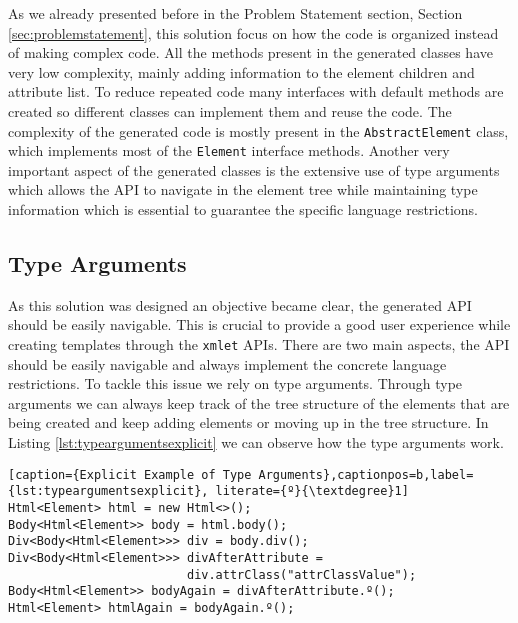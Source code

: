 As we already presented before in the Problem Statement section, Section \ref{sec:problemstatement}, this solution focus on how the code is organized instead of making complex code. All the methods present in the generated classes have very low complexity, mainly adding information to the element children and attribute list. To reduce repeated code many interfaces with default methods are created so different classes can implement them and reuse the code. The complexity of the generated code is mostly present in the \texttt{AbstractElement} class, which implements most of the \texttt{Element} interface methods. Another very important aspect of the generated classes is the extensive use of type arguments which allows the \ac{API} to navigate in the element tree while maintaining type information which is essential to guarantee the specific language restrictions.

\subsection{Type Arguments}
\label{sec:typearguments}

As this solution was designed an objective became clear, the generated \ac{API} should be easily navigable. This is crucial to provide a good user experience while creating templates through the \texttt{xmlet} \ac{API}s. There are two main aspects, the \ac{API} should be easily navigable and always implement the concrete language restrictions. To tackle this issue we rely on type arguments. Through type arguments we can always keep track of the tree structure of the elements that are being created and keep adding elements or moving up in the tree structure. In Listing \ref{lst:typeargumentsexplicit} we can observe how the type arguments work. 


\begin{minipage}{\linewidth}
\begin{lstlisting}[caption={Explicit Example of Type Arguments},captionpos=b,label={lst:typeargumentsexplicit}, literate={º}{\textdegree}1]
Html<Element> html = new Html<>();
Body<Html<Element>> body = html.body();
Div<Body<Html<Element>>> div = body.div();
Div<Body<Html<Element>>> divAfterAttribute = 
                         div.attrClass("attrClassValue");
Body<Html<Element>> bodyAgain = divAfterAttribute.º();
Html<Element> htmlAgain = bodyAgain.º();
\end{lstlisting}
\end{minipage}

